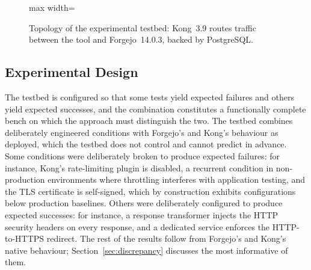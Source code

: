 \begin{figure}[t]
\begin{adjustbox}{max width=\columnwidth}
  \end{adjustbox}
  \caption{Topology of the experimental testbed: Kong~3.9 routes traffic between the tool and Forgejo~14.0.3, backed by PostgreSQL.}
  \label{fig:testbed}
\end{figure}

\subsection{Experimental Design}

The testbed is configured so that some tests yield expected failures and others yield expected successes, and the combination constitutes a functionally complete bench on which the approach must distinguish the two.
The testbed combines deliberately engineered conditions with Forgejo's and Kong's behaviour as deployed, which the testbed does not control and cannot predict in advance.
Some conditions were deliberately broken to produce expected failures: for instance, Kong's rate-limiting plugin is disabled, a recurrent condition in non-production environments where throttling interferes with application testing, and the TLS certificate is self-signed, which by construction exhibits configurations below production baselines.
Others were deliberately configured to produce expected successes: for instance, a response transformer injects the HTTP security headers on every response, and a dedicated service enforces the HTTP-to-HTTPS redirect.
The rest of the results follow from Forgejo's and Kong's native behaviour; Section~\ref{sec:discrepancy} discusses the most informative of them.

